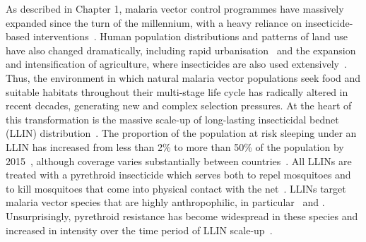 \begin{refsection}
As described in Chapter 1, malaria vector control programmes have massively expanded since the turn of the millennium, with a heavy reliance on insecticide-based interventions~\parencite{Cibulskis2016,Bhatt2015,WHO2019WMR}.
%
Human population distributions and patterns of land use have also changed dramatically, including rapid urbanisation~\parencite{Awumbila2017,OECD2020} and the expansion and intensification of agriculture, where insecticides are also used extensively~\parencite{Otsuka2014,BinswangerMkhize2017,Sternberg2018}.
%
Thus, the environment in which natural malaria vector populations seek food and suitable habitats throughout their multi-stage life cycle has radically altered in recent decades, generating new and complex selection pressures.
%
At the heart of this transformation is the massive scale-up of long-lasting insecticidal bednet (LLIN) distribution~\parencite{WHO2005WIN,RBM2008GMAP,WHO2017LLIN,Bhatt2015,Okumu2020}.
%
The proportion of the population at risk sleeping under an LLIN has increased from less than 2\% to more than 50\% of the population by 2015~\parencite{Cibulskis2016,Bhatt2015}, although coverage varies substantially between countries~\parencite{WHO2019WMR}.
%
All LLINs are treated with a pyrethroid insecticide which serves both to repel mosquitoes and to kill mosquitoes that come into physical contact with the net~\parencite{WHO2020PQVC,Okumu2020}.
%
LLINs target malaria vector species that are highly anthropophilic, in particular \agam\ and \acol.
%
Unsurprisingly, pyrethroid resistance has become widespread in these species and increased in intensity over the time period of LLIN scale-up~\parencite{Hemingway2016,Hancock2020}.



\end{refsection}
